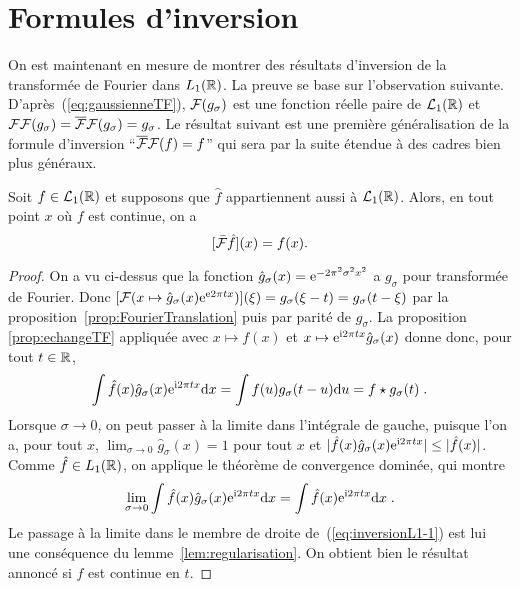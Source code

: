 \section{Formules d'inversion}

On est maintenant en mesure de montrer des r{\'e}sultats d'inversion de la
transform{\'e}e de Fourier dans $L_1(\mathbb{R})$. La preuve se base sur l'observation
suivante. D'apr{\`e}s~(\ref{eq:gaussienneTF}), $\mathcal{F}(g_\sigma)$ est une fonction
r{\'e}elle paire de $\mathcal{L}_1(\mathbb{R})$ et
$\mathcal{F}\mathcal{F}(g_\sigma)=\overline{\mathcal{F}}\mathcal{F}(g_\sigma)=g_\sigma$. Le r{\'e}sultat suivant est une
premi{\`e}re g{\'e}n{\'e}ralisation de la formule d'inversion ``$\overline{\mathcal{F}}\mathcal{F}(f)=f$'' qui sera
par la suite {\'e}tendue {\`a} des cadres bien plus g{\'e}n{\'e}raux.

\begin{proposition}\label{prop:inversionFourierL1}
Soit $f\in\mathcal{L}_1(\mathbb{R})$ et supposons que $\hat{f}$ appartiennent aussi
{\`a} $\mathcal{L}_1(\mathbb{R})$. Alors, en tout point $x$ o{\`u} $f$ est continue, on a
\begin{equation}
\label{eq:inversionFT}
[\bar{\mathcal{F}} \hat{f}](x) = f(x).
\end{equation}
\end{proposition}
\begin{proof}
On a vu ci-dessus que la fonction $\hat{g}_\sigma(x) = \mathrm{e}^{- 2 \pi^2 \sigma^2 x^2}$
a ${g}_\sigma$ pour transform{\'e}e de Fourier. Donc
$[\mathcal{F}(x\mapsto \hat{g}_\sigma(x)\mathrm{e}^{\mathrm{e} 2 \pi t x})](\xi)={g}_\sigma(\xi-t)={g}_\sigma(t-\xi)$ par la
proposition~\ref{prop:FourierTranslation} puis par parit{\'e} de $g_\sigma$. La proposition \ref{prop:echangeTF} appliqu{\'e}e avec
$x \mapsto f(x)$ et $x \mapsto \mathrm{e}^{\mathrm{i} 2 \pi t x} \hat{g}_\sigma(x)$ donne donc, pour tout $t\in \mathbb{R}$,
\begin{equation}
\label{eq:inversionL1-1}
\int \hat{f}(x) \hat{g}_\sigma(x) \mathrm{e}^{\mathrm{i} 2 \pi t x} \mathrm{d} x = \int f(u) {g}_\sigma(t-u) \mathrm{d} u = f\star g_\sigma(t) \;.
\end{equation}
Lorsque $\sigma \to 0$, on peut passer {\`a} la limite dans l'int{\'e}grale de gauche, puisque l'on a, pour tout
$x$, $\lim_{\sigma \to 0} \hat{g}_\sigma(x)= 1$ pour tout $x$ et $|\hat{f}(x) \hat{g}_\sigma(x) \mathrm{e}^{\mathrm{i} 2 \pi t x}| \leq |\hat{f}(x)|$.
Comme $\hat{f} \in L_1(\mathbb{R})$, on applique le th{\'e}or{\`e}me de convergence domin{\'e}e, qui montre
$$
\lim_{\sigma \to 0} \int \hat{f}(x) \hat{g}_\sigma(x) \mathrm{e}^{ \mathrm{i} 2 \pi t x} \mathrm{d} x = \int \hat{f}(x) \mathrm{e}^{\mathrm{i} 2 \pi t x} \mathrm{d} x \;.
$$
Le passage {\`a} la limite dans le membre de droite de~(\ref{eq:inversionL1-1}) est lui une cons{\'e}quence du
lemme~\ref{lem:regularisation}. On obtient bien le r{\'e}sultat annonc{\'e} si $f$ est continue en $t$.
\end{proof}


